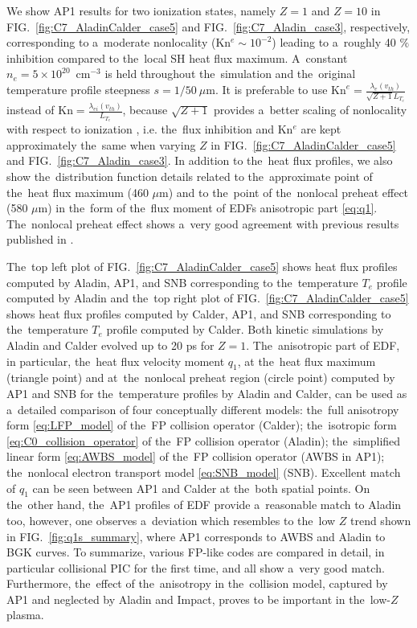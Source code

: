 \documentclass[
 aps,
 jmp,
 amsmath,amssymb,
 twocolumn,
]{revtex4-1}
\newcommand{\figref}[1]{FIG.~\ref{#1}}
\newcommand{\mfpe}{\lambda_e}
\newcommand{\mfpei}{\lambda_{ei}}
\newcommand{\Zbar}{Z}
\newcommand{\vth}{v_{th}}
\newcommand{\Te}{T_e}
\newcommand{\ed}{n_e}
\begin{document}
We show AP1 results for two ionization states, namely $\Zbar = 1$ and 
$\Zbar = 10$ 
in \figref{fig:C7_AladinCalder_case5} and \figref{fig:C7_Aladin_case3}, 
respectively, corresponding to a~moderate nonlocality 
(Kn$^e \sim 10^{-2}$) leading to a~roughly 40 $\%$ inhibition compared 
to the~local SH heat flux maximum. 
A~constant $\ed = 5\times10^{20}$~cm$^{-3}$ is held throughout the~simulation 
and the~original temperature profile steepness $s = 1/50~\mu$m.
It is preferable to use 
$\text{Kn}^e = \frac{\mfpe(\vth)}{\sqrt{\Zbar + 1}L_{T_e}}$ instead of
 $\text{Kn} = \frac{\mfpei(\vth)}{L_{T_e}}$, 
because $\sqrt{\Zbar + 1}$ provides 
a~better scaling of nonlocality with respect
to ionization \cite{LMV_1983_7}, i.e. the~flux inhibition and Kn$^e$ are
kept approximately the~same when varying $\Zbar$ in 
\figref{fig:C7_AladinCalder_case5} and \figref{fig:C7_Aladin_case3}.
In addition to the~heat flux profiles, we also show the~distribution function 
details related to the~approximate point of the~heat flux maximum (460 $\mu$m) 
and to the~point of the~nonlocal preheat effect (580 $\mu$m) in the~form of
the~flux moment of EDFs anisotropic part \eqref{eq:q1}.
The~nonlocal preheat effect shows a~very good agreement with 
previous results published in \cite{Sherlock_PoP2017}.

The~top left plot of \figref{fig:C7_AladinCalder_case5} shows heat flux 
profiles computed by Aladin, AP1, and SNB corresponding to the~temperature 
$\Te$ profile computed by Aladin and the~top right plot of 
\figref{fig:C7_AladinCalder_case5} shows heat flux profiles computed by Calder, 
AP1, and SNB corresponding to the~temperature $\Te$ profile computed by Calder.
Both kinetic simulations by Aladin and Calder evolved up to 20 ps for 
$\Zbar = 1$. 
The~anisotropic part of EDF, in particular, 
the~heat flux velocity moment $q_1$, 
at the~heat flux maximum (triangle point) and at~the~nonlocal preheat region 
(circle point) computed by AP1 and SNB for the~temperature profiles by 
Aladin and Calder, can be used as a~detailed comparison of four conceptually
different models: the~full anisotropy form \eqref{eq:LFP_model} of 
the~FP collision operator (Calder); the~isotropic form 
\eqref{eq:C0_collision_operator} of the~FP collision operator (Aladin);
the~simplified linear form \eqref{eq:AWBS_model} of the~FP collision operator
(AWBS in AP1); 
the~nonlocal electron transport model \eqref{eq:SNB_model} (SNB). 
Excellent match of $q_1$ can be seen between 
AP1 and Calder at the~both spatial points. On the~other hand, 
the~AP1 profiles of EDF provide a~reasonable match to Aladin too, however,
one observes a~deviation
which resembles to the~low $\Zbar$ trend shown in \figref{fig:q1s_summary}, 
where AP1 corresponds to AWBS and Aladin to BGK curves. To summarize,
various FP-like codes are compared in detail, in particular collisional PIC 
for the first time, and all show a~very good match. 
Furthermore, the~effect of the~anisotropy in the~collision model, 
captured by AP1 and neglected by Aladin and Impact, proves to be important
in the~low-$\Zbar$ plasma. 
\end{document}
